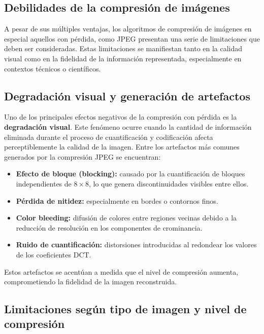 \documentclass[8pt,a4paper]{article}
\theoremstyle{definition}
\theoremstyle{remark}
\begin{document}
\begin{multicols}{2}
   \begin{center}
    \section{Debilidades de la compresión de imágenes}
    \end{center}

        A pesar de sus múltiples ventajas, los algoritmos de compresión de imágenes en especial aquellos con pérdida, como JPEG presentan una serie de limitaciones que deben ser consideradas. Estas limitaciones se manifiestan tanto en la calidad visual como en la fidelidad de la información representada, especialmente en contextos técnicos o científicos.
        
        \subsection{Degradación visual y generación de artefactos}
        Uno de los principales efectos negativos de la compresión con pérdida es la \textbf{degradación visual}. Este fenómeno ocurre cuando la cantidad de información eliminada durante el proceso de cuantificación y codificación afecta perceptiblemente la calidad de la imagen. Entre los artefactos más comunes generados por la compresión JPEG se encuentran:
            
        \begin{itemize}
        \item \textbf{Efecto de bloque (blocking):} causado por la cuantificación de bloques independientes de \(8 \times 8\), lo que genera discontinuidades visibles entre ellos.
        \item \textbf{Pérdida de nitidez:} especialmente en bordes o contornos finos.
        \item \textbf{Color bleeding:} difusión de colores entre regiones vecinas debido a la reducción de resolución en los componentes de crominancia.
        \item \textbf{Ruido de cuantificación:} distorsiones introducidas al redondear los valores de los coeficientes DCT.
        \end{itemize}
            
        Estos artefactos se acentúan a medida que el nivel de compresión aumenta, comprometiendo la fidelidad de la imagen reconstruida.
        
        \subsection{Limitaciones según tipo de imagen y nivel de compresión}
        

\end{multicols}
\end{document}

